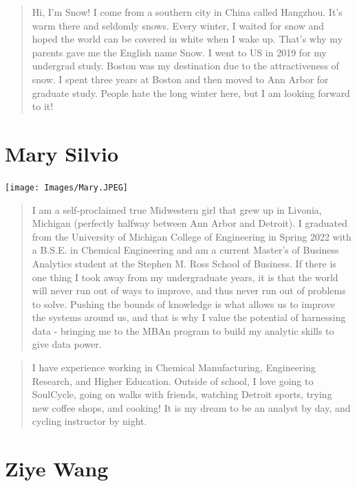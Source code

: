 \documentclass[
]{book}
\begin{document}
\begin{quote}
Hi, I'm Snow! I come from a southern city in China called Hangzhou. It's warm there and seldomly snows. Every winter, I waited for snow and hoped the world can be covered in white when I wake up. That's why my parents gave me the English name Snow. I went to US in 2019 for my undergrad study. Boston was my destination due to the attractiveness of snow. I spent three years at Boston and then moved to Ann Arbor for graduate study. People hate the long winter here, but I am looking forward to it!
\end{quote}

\hypertarget{mary-silvio-1}{%
\section*{Mary Silvio}\label{mary-silvio-1}}

\texttt{[image: Images/Mary.JPEG]}

\begin{quote}
I am a self-proclaimed true Midwestern girl that grew up in Livonia, Michigan (perfectly halfway between Ann Arbor and Detroit). I graduated from the University of Michigan College of Engineering in Spring 2022 with a B.S.E. in Chemical Engineering and am a current Master's of Business Analytics student at the Stephen M. Ross School of Business. If there is one thing I took away from my undergraduate years, it is that the world will never run out of ways to improve, and thus never run out of problems to solve. Pushing the bounds of knowledge is what allows us to improve the systems around us, and that is why I value the potential of harnessing data - bringing me to the MBAn program to build my analytic skills to give data power.
\end{quote}

\begin{quote}
I have experience working in Chemical Manufacturing, Engineering Research, and Higher Education. Outside of school, I love going to SoulCycle, going on walks with friends, watching Detroit sports, trying new coffee shops, and cooking! It is my dream to be an analyst by day, and cycling instructor by night.
\end{quote}

\hypertarget{ziye-wang-1}{%
\section*{Ziye Wang}\label{ziye-wang-1}}
\end{document}
